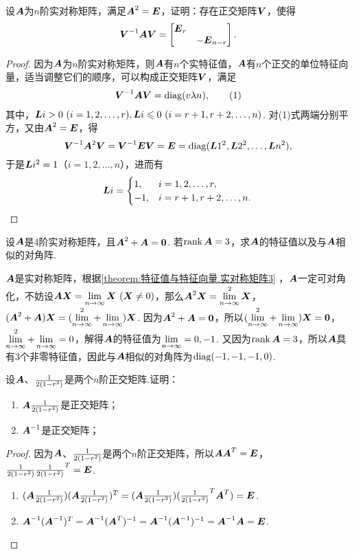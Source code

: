\begin{example}
设\(\A\)为\(n\)阶实对称矩阵，满足\(\A^2=\E\)，证明：存在正交矩阵\(\Q\)，使得\[
\Q^{-1}\A\Q=\begin{bmatrix} \E_r \\ & -\E_{n-r} \end{bmatrix}.
\]
\begin{proof}
因为\(\A\)为\(n\)阶实对称矩阵，则\(\A\)有\(n\)个实特征值，\(\A\)有\(n\)个正交的单位特征向量，适当调整它们的顺序，可以构成正交矩阵\(\Q\)，满足\begin{gather}
\Q^{-1}\A\Q=\diag(\v{\lambda}{n}), \tag1
\end{gather}其中，\(\L{i}>0\ (i=1,2,\dotsc,r),%
\L{i}\leqslant0\ (i=r+1,r+2,\dotsc,n)\).
对(1)式两端分别平方，又由\(\A^2=\E\)，得\[
\Q^{-1}\A^2\Q
= \Q^{-1}\E\Q
= \E
= \diag(\L{1}^2,\L{2}^2,\dotsc,\L{n}^2),
\]于是\(\L{i}^2=1\)（\(i=1,2,\dotsc,n\)），进而有\[
\L{i}= \begin{cases}
1, & i=1,2,\dotsc,r, \\
-1, & i=r+1,r+2,\dotsc,n.
\end{cases}
\qedhere
\]
\end{proof}
\end{example}

\begin{example}
设\(\A\)是4阶实对称矩阵，且\(\A^2+\A=\z\).
若\(\rank\A=3\)，求\(\A\)的特征值以及与\(\A\)相似的对角阵.
\begin{solution}
\(\A\)是实对称矩阵，根据\cref{theorem:特征值与特征向量.实对称矩阵3} ，\(\A\)一定可对角化，不妨设\(\A\x=\l\x\ (\x\neq0)\)，那么\(\A^2\x=\l^2\x\)，\((\A^2+\A)\x=(\l^2+\l)\x\).
因为\(\A^2+\A=\z\)，所以\((\l^2+\l)\x=\z\)，\(\l^2+\l=0\)，解得\(\A\)的特征值为\(\l=0,-1\).
又因为\(\rank\A=3\)，所以\(\A\)具有3个非零特征值，因此与\(\A\)相似的对角阵为\(\diag(-1,-1,-1,0)\).
\end{solution}
\end{example}

\begin{example}
设\(\A\)、\(\B\)是两个\(n\)阶正交矩阵.证明：
\begin{enumerate}
\item \(\A\B\)是正交矩阵；
\item \(\A^{-1}\)是正交矩阵；
\end{enumerate}
\begin{proof}
因为\(\A\)、\(\B\)是两个\(n\)阶正交矩阵，所以\(\A\A^T = \E\)，\(\B\B^T = \E\).
\begin{enumerate}
\item \((\A\B)(\A\B)^T
= (\A\B)(\B^T\A^T)
= \E\).
\item \(\A^{-1}(\A^{-1})^T
= \A^{-1} (\A^T)^{-1}
= \A^{-1} (\A^{-1})^{-1}
= \A^{-1} \A
= \E\).
\qedhere
\end{enumerate}
\end{proof}
\end{example}

